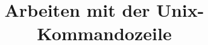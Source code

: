 

\title[Unix]{Arbeiten mit der Unix-Kommandozeile}



{
  \begin{frame}
    \titlepage
  \end{frame}
}




